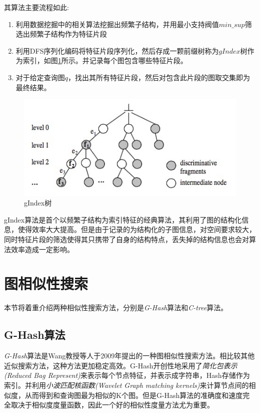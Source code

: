 \documentclass{XDBAthesis}
\begin{document}
其算法主要流程如此:
\begin{enumerate}
    \item 利用数据挖掘中的相关算法挖掘出频繁子结构，并用最小支持阀值$min\_sup$筛选出频繁子结构作为特征片段
    \item 利用DFS序列化编码将特征片段序列化，然后存成一颗前缀树称为$gIndex$树作为索引，如图\ref{fg:gIndex}所示。并记录每个图包含哪些特征片段。
    \item 对于给定查询图$q$，找出其所有特征片段，然后对包含此片段的图取交集即为最终结果。
\end{enumerate}
\begin{figure}[htb]
    \centering
    \includegraphics[width=\textwidth ]{../figures/gIndex}
    \caption{gIndex树}
    \label{fg:gIndex}
\end{figure}

gIndex算法是首个以频繁子结构为索引特征的经典算法，其利用了图的结构化信息，使得效率大大提高。但是由于记录的为结构化的子图信息，对空间要求较大，同时特征片段的筛选使得其只携带了自身的结构特点，丢失掉的结构信息也会对算法效率造成一定影响。

\section{图相似性搜索}
本节将着重介绍两种相似性搜索方法，分别是\emph{G-Hash}算法\cite{ghash}和\emph{C-tree}算法\cite{C-Tree}。
\subsection{G-Hash算法}
\emph{G-Hash}算法是Wang教授等人于2009年提出的一种图相似性搜索方法。相比较其他近似搜索方法，这种方法更加稳定高效。G-Hash开创性地采用了\emph{简化包表示(Reduced Bag Represent)}来表示每个节点特征，并表示成字符串，Hash存储作为索引。并利用\emph{小波匹配核函数(Wavelet Graph matching kernels)}来计算节点间的相似度，从而得到和查询图最为相似的K个图。但是G-Hash算法的准确度和速度完全取决于相似度度量函数，因此一个好的相似性度量方法尤为重要。
\end{document}

